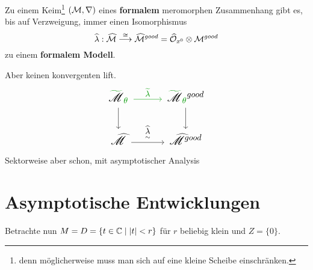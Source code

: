 \begin{paracol}{2}
  \begin{tthm}
    Zu einem Keim\footnote{denn möglicherweise muss man sich auf eine kleine
    Scheibe einschränken.} $(\mathcal{M},\nabla)$ eines \textbf{formalem} meromorphen
    Zusammenhang gibt es, bis auf Verzweigung, immer einen Isomorphismus
    \[
      \widehat\lambda:\widehat{\mathcal{M}}
      \overset{\cong}\longrightarrow
      \widehat{\mathcal{M}}^{good}
      =\widehat{\mathcal{O}}_{x^0}\otimes\mathcal{M}^{good}
    \]
    zu einem \textbf{formalem Modell}.
  \end{tthm}
\switchcolumn
  \begin{rem}
    Aber keinen konvergenten lift.
    \[ \Large\begin{tikzcd}
        \textcolor{green!60!black}{\tilde{\textcolor{black}{\sM}}_{\theta}}
        \dar
        \rar[green!60!black]{\tilde\lambda}&
        \textcolor{green!60!black}{%
          \tilde{\textcolor{black}{\sM}}_{\theta}}^{good} \dar
          \\\hat\sM \rar{\underset{\sim}{\hat\lambda}} &
          \hat\sM^{good}
    \end{tikzcd} \]
    \textcolor{green!60!black}{Sektorweise aber schon, mit asymptotischer
    Analysis}
  \end{rem}
\end{paracol}
\pagebreak \section{Asymptotische Entwicklungen} %
Betrachte nun $M=D=\{t\in\mathbb{C}\mid|t|<r\}$ für $r$ beliebig klein und $Z=\{0\}$.

